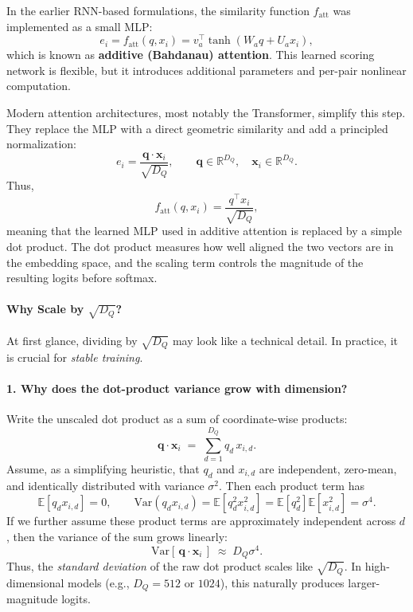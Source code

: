 \noindent
In the earlier RNN-based formulations, the similarity function \(f_{\text{att}}\) was implemented as a small MLP:
\begin{equation}
	e_i
	=
	f_{\text{att}}(q, x_i)
	=
	v_a^{\top}\tanh(W_a q + U_a x_i),
\end{equation}
which is known as \textbf{additive (Bahdanau) attention}.
This learned scoring network is flexible, but it introduces additional parameters and per-pair nonlinear computation.

\noindent
Modern attention architectures, most notably the Transformer, simplify this step.
They replace the MLP with a direct geometric similarity and add a principled normalization:
\begin{equation}
	e_i
	=
	\frac{\mathbf{q} \cdot \mathbf{x}_i}{\sqrt{D_Q}},
	\qquad
	\mathbf{q}\in\mathbb{R}^{D_Q},
	\quad
	\mathbf{x}_i\in\mathbb{R}^{D_Q}.
\end{equation}
Thus,
\begin{equation}
	f_{\text{att}}(q, x_i)
	=
	\frac{q^{\top}x_i}{\sqrt{D_Q}},
\end{equation}
meaning that the learned MLP used in additive attention is replaced by a simple dot product.
The dot product measures how well aligned the two vectors are in the embedding space, and the scaling term controls the magnitude of the resulting logits before softmax.

\paragraph{Why Scale by \(\sqrt{D_Q}\)?}

\noindent
At first glance, dividing by \(\sqrt{D_Q}\) may look like a technical detail.
In practice, it is crucial for \emph{stable training}.

\paragraph{1. Why does the dot-product variance grow with dimension?}

\noindent
Write the unscaled dot product as a sum of coordinate-wise products:
\begin{equation}
	\mathbf{q}\cdot\mathbf{x}_i \;=\; \sum_{d=1}^{D_Q} q_d\,x_{i,d}.
\end{equation}
Assume, as a simplifying heuristic, that \(q_d\) and \(x_{i,d}\) are independent, zero-mean, and identically distributed with variance \(\sigma^2\).
Then each product term has
\begin{equation}
	\mathbb{E}[q_d x_{i,d}] = 0,
	\qquad
	\text{Var}(q_d x_{i,d})
	=
	\mathbb{E}[q_d^2 x_{i,d}^2]
	=
	\mathbb{E}[q_d^2]\mathbb{E}[x_{i,d}^2]
	=
	\sigma^4.
\end{equation}
If we further assume these product terms are approximately independent across \(d\), then the variance of the sum grows linearly:
\begin{equation}
	\text{Var}[\,\mathbf{q}\cdot\mathbf{x}_i\,] 
	\;\approx\;
	D_Q \sigma^4.
\end{equation}
Thus, the \emph{standard deviation} of the raw dot product scales like \(\sqrt{D_Q}\).
In high-dimensional models (e.g., \(D_Q = 512\) or \(1024\)), this naturally produces larger-magnitude logits.

